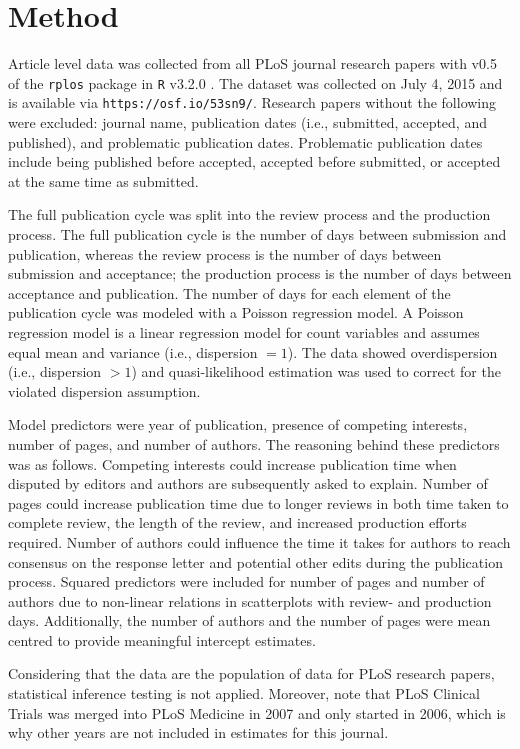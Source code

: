 \section*{Method}
Article level data was collected from all PLoS journal research papers with v0.5 of the \texttt{rplos} package \cite{rplos} in \texttt{R} v3.2.0 \cite{rcran}. The dataset was collected on July 4, 2015 and is available via \texttt{https://osf.io/53sn9/}. Research papers without the following were excluded: journal name, publication dates (i.e., submitted, accepted, and published), and problematic publication dates. Problematic publication dates include being published before accepted, accepted before submitted, or accepted at the same time as submitted.

The full publication cycle was split into the review process and the production process. The full publication cycle is the number of days between submission and publication, whereas the review process is the number of days between submission and acceptance; the production process is the number of days between acceptance and publication. The number of days for each element of the publication cycle was modeled with a Poisson regression model. A Poisson regression model is a linear regression model for count variables and assumes equal mean and variance (i.e., dispersion $=1$). The data showed overdispersion (i.e., dispersion $>1$) and quasi-likelihood estimation was used to correct for the violated dispersion assumption.

Model predictors were year of publication, presence of competing interests, number of pages, and number of authors. The reasoning behind these predictors was as follows. Competing interests could increase publication time when disputed by editors and authors are subsequently asked to explain. Number of pages could increase publication time due to longer reviews in both time taken to complete review, the length of the review, and increased production efforts required. Number of authors could influence the time it takes for authors to reach consensus on the response letter and potential other edits during the publication process. Squared predictors were included for number of pages and number of authors due to non-linear relations in scatterplots with review- and production days. Additionally, the number of authors and the number of pages were mean centred to provide meaningful intercept estimates.

Considering that the data are the population of data for PLoS research papers, statistical inference testing is not applied. Moreover, note that PLoS Clinical Trials was merged into PLoS Medicine in 2007 and only started in 2006, which is why other years are not included in estimates for this journal.
  
  